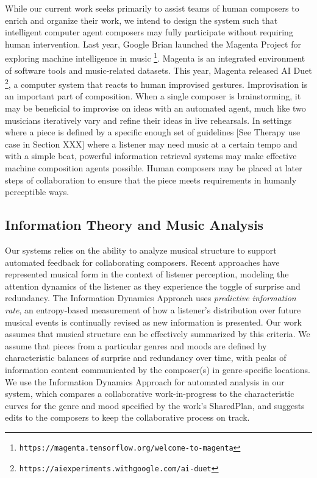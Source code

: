 \documentclass[final,authoryear,5p,times,twocolumn]{elsarticle}
\begin{document}
While our current work seeks primarily to assist teams of human composers to enrich and organize their work, we intend to design the system such that intelligent computer agent composers may fully participate without requiring human intervention. Last year, Google Brian launched the Magenta Project for exploring machine intelligence in music \footnote{\texttt{https://magenta.tensorflow.org/welcome-to-magenta}}. Magenta is an integrated environment of software tools and music-related datasets. This year, Magenta released AI Duet \footnote{\texttt{https://aiexperiments.withgoogle.com/ai-duet}}, a computer system that reacts to human improvised gestures. Improvisation is an important part of composition. When a single composer is brainstorming, it may be beneficial to improvise on ideas with an automated agent, much like two musicians iteratively vary and refine their ideas in live rehearsals. In settings where a piece is defined by a specific enough set of guidelines [See Therapy use case in Section XXX]  where a listener may need music at a certain tempo and with a simple beat, powerful information retrieval systems may make effective machine composition agents possible. Human composers may be placed at later steps of collaboration to ensure that the piece meets requirements in humanly perceptible ways.

\subsection{Information Theory and Music Analysis}

Our systems relies on the ability to analyze musical structure to support automated feedback for collaborating composers. Recent approaches have represented musical form in the context of listener perception, modeling the attention dynamics of the listener as they experience the toggle of surprise and redundancy. The Information Dynamics Approach \citep{abdallah2012cognitive} uses \textit{predictive information rate}, an entropy-based measurement of how a listener's distribution over future musical events is continually revised as new information is presented.  Our work assumes that musical structure can be effectively summarized by this criteria. We assume that pieces from a particular genres and moods are defined by characteristic balances of surprise and redundancy over time, with peaks of information content communicated by the composer(s) in genre-specific locations. We use the Information Dynamics Approach for automated analysis in our system, which compares a collaborative work-in-progress to the characteristic curves for the genre and mood specified by the work's SharedPlan, and suggests edits to the composers to keep the collaborative process on track. %
\end{document}
